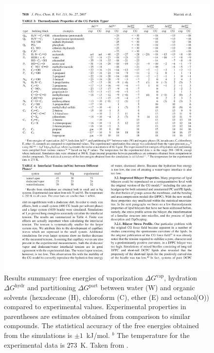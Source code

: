 \begin{figure}[h!t]%
	\center
	\includegraphics[width=\textwidth]{img/martiniTarget}%
	\caption{Results summary: free energies of vaporization $\Delta G^\text{vap}$, hydration $\Delta G^\text{hydr}$ and partitioning $\Delta G^\text{part}$ between water (W) and organic solvents (hexadecane (H), chloroform (C), ether (E) and octanol(O)) compared to experimental values. Experimental properties in parentheses are estimates obtained from comparison to similar compounds. The statistical accuracy of the free energies obtained from the simulations is $\pm 1$~kJ/mol. $^b$ The temperature for the experimental data is $273$~K. Taken from \cite{Martini}.}
	\label{fig:martiniTarget}
\end{figure}


